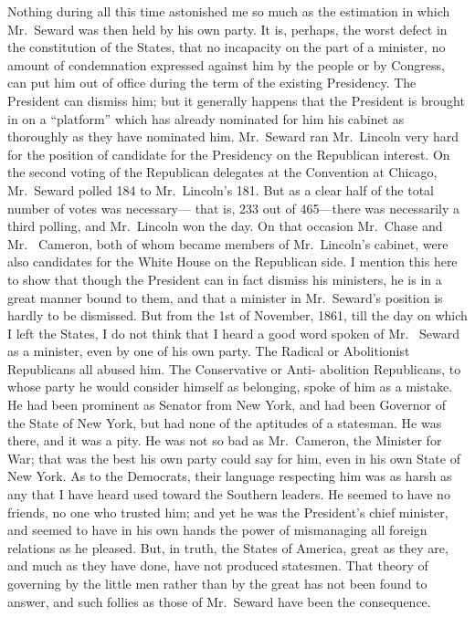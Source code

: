 Nothing during all this time astonished me so much as the
estimation in which Mr.\ Seward was then held by his own party.  It
is, perhaps, the worst defect in the constitution of the States,
that no incapacity on the part of a minister, no amount of
condemnation expressed against him by the people or by Congress,
can put him out of office during the term of the existing
Presidency.  The President can dismiss him; but it generally
happens that the President is brought in on a ``platform'' which has
already nominated for him his cabinet as thoroughly as they have
nominated him.  Mr.\ Seward ran Mr.\ Lincoln very hard for the
position of candidate for the Presidency on the Republican
interest.  On the second voting of the Republican delegates at the
Convention at Chicago, Mr.\ Seward polled 184 to Mr.\ Lincoln's 181.
But as a clear half of the total number of votes was necessary---%
that is, 233 out of 465---there was necessarily a third polling, and
Mr.\ Lincoln won the day.  On that occasion Mr.\ Chase and Mr.\ %
Cameron, both of whom became members of Mr.\ Lincoln's cabinet, were
also candidates for the White House on the Republican side.  I
mention this here to show that though the President can in fact
dismiss his ministers, he is in a great manner bound to them, and
that a minister in Mr.\ Seward's position is hardly to be dismissed.
But from the 1st of November, 1861, till the day on which I left
the States, I do not think that I heard a good word spoken of Mr.\ %
Seward as a minister, even by one of his own party.  The Radical or
Abolitionist Republicans all abused him.  The Conservative or Anti-
abolition Republicans, to whose party he would consider himself as
belonging, spoke of him as a mistake.  He had been prominent as
Senator from New York, and had been Governor of the State of New
York, but had none of the aptitudes of a statesman.  He was there,
and it was a pity.  He was not so bad as Mr.\ Cameron, the Minister
for War; that was the best his own party could say for him, even in
his own State of New York.  As to the Democrats, their language
respecting him was as harsh as any that I have heard used toward
the Southern leaders.  He seemed to have no friends, no one who
trusted him; and yet he was the President's chief minister, and
seemed to have in his own hands the power of mismanaging all
foreign relations as he pleased.  But, in truth, the States of
America, great as they are, and much as they have done, have not
produced statesmen.  That theory of governing by the little men
rather than by the great has not been found to answer, and such
follies as those of Mr.\ Seward have been the consequence.

